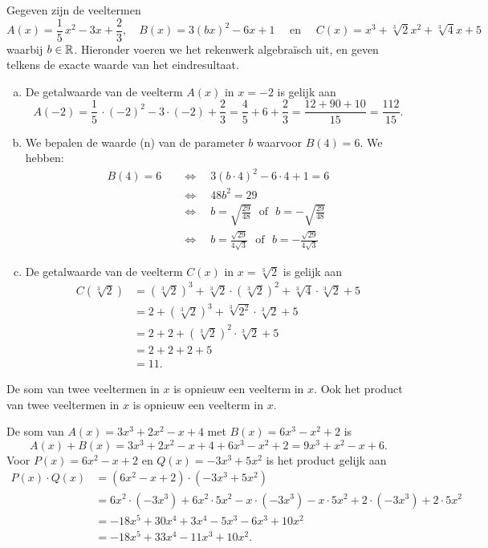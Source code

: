 \documentclass{ximera}
\begin{document}
\begin{example} 
Gegeven zijn de veeltermen
\[
A(x) = \frac{1}{5}\,x^2-3x+\frac{2}{3}, \quad B(x) = 3(bx)^2-6x+1 \quad \text{ en } \quad C(x) = x^3 + \sqrt[3]{2} x^2 + \sqrt[3]{4}x+5
\]
waarbij $b \in \mathbb{R}$. Hieronder voeren we het rekenwerk algebra\"isch uit, en geven telkens de exacte waarde van het eindresultaat. 
\begin{enumerate}[(a)]
\item
De getalwaarde van de veelterm $A(x)$ in $x = -2$ is gelijk aan
\[
A(-2) = \frac{1}{5}\,\cdot (-2)^2-3\cdot(-2)+\frac{2}{3} = \frac{4}{5} +6+ \frac{2}{3} = \frac{12 + 90 + 10}{15} = \frac{112}{15}.
\]
\item
We bepalen de waarde (n) van de parameter $b$ waarvoor $B(4) = 6$. We hebben:
\begin{align*}
B(4) = 6 \quad 
& \Leftrightarrow \quad 3(b\cdot 4)^2-6\cdot 4+1 = 6 \\ 
& \Leftrightarrow \quad 48b^2 = 29 \\
& \Leftrightarrow \quad b = \sqrt{\frac{29}{48}} \,\,\text{ of }\,\, b = - \sqrt{\frac{29}{48}} \\
& \Leftrightarrow \quad b = \frac{\sqrt{29}}{4\sqrt{3}} \,\,\text{ of }\,\, b = - \frac{\sqrt{29}}{4\sqrt{3}}
\end{align*}
\item
De getalwaarde van de veelterm $C(x)$ in $x = \sqrt[3]{2}$ is gelijk aan
\begin{align*}
C(\sqrt[3]{2}) & = (\sqrt[3]{2})^3 + \sqrt[3]{2}\cdot(\sqrt[3]{2})^2 + \sqrt[3]{4}\cdot \sqrt[3]{2}+5 \\
& = 2 + (\sqrt[3]{2})^3 + \sqrt[3]{2^2}\cdot \sqrt[3]{2} + 5 \\
& = 2 + 2 + (\sqrt[3]{2})^2 \cdot \sqrt[3]{2} + 5 \\
& = 2 + 2 + 2 + 5 \\
& = 11.
\end{align*}
\end{enumerate}
\end{example} 

De som van twee veeltermen in $x$ is opnieuw een veelterm in $x$. Ook het product van twee veeltermen in $x$ is opnieuw een veelterm in $x$. 

\begin{example} 
De som van $A(x) = 3x^3+2x^2-x+4$ met $B(x) = 6x^3-x^2+2$ is 
\[
A(x) + B(x) = 3x^3+2x^2-x+4 + 6x^3-x^2+2 = 9x^3 + x^2 - x + 6.
\]
Voor $P(x) = 6x^2-x+2$ en $Q(x) = -3x^3+5x^2$ is het product gelijk aan
\begin{align*}
P(x) \cdot Q(x) 
& = (6x^2-x+2) \cdot (-3x^3+5x^2) \\
& = 6x^2 \cdot (-3x^3) + 6x^2\cdot 5x^2 - x \cdot(-3x^3) - x \cdot 5x^2 + 2 \cdot(-3x^3) + 2 \cdot 5x^2 \\
& = -18x^5 + 30x^4 + 3x^4 - 5x^3 - 6x^3 + 10x^2 \\
& = -18x^5 + 33x^4 - 11x^3 + 10x^2.
\end{align*}
\end{example} 
\end{document}

